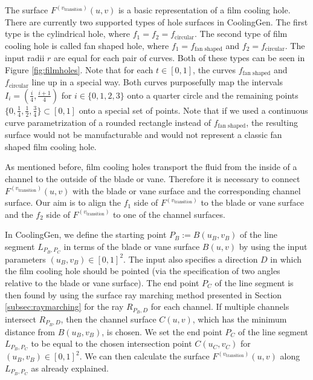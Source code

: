 \documentclass[a4paper, 11pt]{report}
\theoremstyle{definition}
\begin{document}
	The surface $F^{(v_\textrm{transition})}(u,v)$ is a basic representation of a film cooling hole. There are currently two supported types of hole surfaces in CoolingGen. The first type is the cylindrical hole, where $f_1 = f_2 = f_\textrm{circular}$. The second type of film cooling hole is called fan shaped hole, where $f_1 = f_\textrm{fan shaped}$ and $f_2 = f_\textrm{circular}$. The input radii $r$ are equal for each pair of curves. Both of these types can be seen in Figure \ref{fig:filmholes}. Note that for each $t \in [0,1]$, the curves $f_\textrm{fan shaped}$ and $f_\textrm{circular}$ line up in a special way. Both curves purposefully map the intervals $I_i = (\frac{i}{4},\frac{i+1}{4})$ for $i \in \{0, 1, 2, 3\}$ onto a quarter circle and the remaining points $\{0, \frac{1}{4}, \frac{1}{2}, \frac{3}{4}\} \subset [0,1]$ onto a special set of points. Note that if we used a continuous curve parametrization of a rounded rectangle instead of $f_\textrm{fan shaped}$, the resulting surface would not be manufacturable and would not represent a classic fan shaped film cooling hole.

	As mentioned before, film cooling holes transport the fluid from the inside of a channel to the outside of the blade or vane. Therefore it is necessary to connect $F^{(v_\textrm{transition})}(u,v)$ with the blade or vane surface and the corresponding channel surface. Our aim is to align the $f_1$ side of $F^{(v_\textrm{transition})}$ to the blade or vane surface and the $f_2$ side of $F^{(v_\textrm{transition})}$ to one of the channel surfaces.

	In CoolingGen, we define the starting point $P_B := B(u_B, v_B)$ of the line segment $L_{P_B,P_C}$ in terms of the blade or vane surface $B(u,v)$ by using the input parameters $(u_B, v_B) \in [0,1]^2$. The input also specifies a direction $D$ in which the film cooling hole should be pointed (via the specification of two angles relative to the blade or vane surface). The end point $P_C$ of the line segment is then found by using the surface ray marching method presented in Section \ref{subsec:raymarching} for the ray $R_{P_B,D}$ for each channel. If multiple channels intersect $R_{P_B,D}$, then the channel surface $C(u,v)$, which has the minimum distance from $B(u_B, v_B)$, is chosen. We set the end point $P_C$ of the line segment $L_{P_B,P_C}$ to be equal to the chosen intersection point $C(u_C, v_C)$ for $(u_B, v_B) \in [0,1]^2$. We can then calculate the surface $F^{(v_\textrm{transition})}(u,v)$ along $L_{P_B,P_C}$ as already explained.
\end{document}
